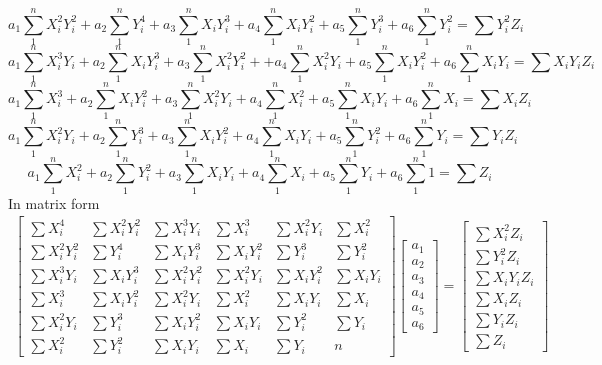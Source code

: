 \documentclass{article}
\begin{document}
\begin{equation}
a_1 \sum_1^n X_i^2Y_i^2 + a_2 \sum_1^n Y_i^4 + a_3 \sum_1^n X_iY_i^3 + a_4 \sum_1^n X_iY_i^2 +a_5 \sum_1^n Y_i^3 + a_6 \sum_1^n Y_i^2= \sum Y_i^2Z_i
\end{equation}
\begin{equation}
a_1 \sum_1^n X_i^3Y_i + a_2 \sum_1^n X_iY_i^3 + a_3 \sum_1^n X_i^2Y_i^2 + + a_4 \sum_1^n X_i^2Y_i +a_5 \sum_1^n X_iY_i^2 + a_6 \sum_1^n X_iY_i = \sum X_iY_iZ_i
\end{equation}
\begin{equation}
a_1 \sum_1^n X_i^3 + a_2 \sum_1^n X_iY_i^2 + a_3 \sum_1^n X_i^2Y_i + a_4 \sum_1^n X_i^2 +a_5 \sum_1^n X_iY_i + a_6 \sum_1^n X_i = \sum X_iZ_i
\end{equation}
\begin{equation}
a_1 \sum_1^n X_i^2Y_i + a_2 \sum_1^n Y_i^3 + a_3 \sum_1^n X_iY_i^2 + a_4 \sum_1^n X_iY_i +a_5 \sum_1^n Y_i^2 + a_6 \sum_1^n Y_i = \sum Y_iZ_i
\end{equation}
\begin{equation}
a_1 \sum_1^n X_i^2 + a_2 \sum_1^n Y_i^2 + a_3 \sum_1^n X_iY_i + a_4 \sum_1^n X_i +a_5 \sum_1^n Y_i + a_6 \sum_1^n 1 = \sum Z_i
\end{equation}
In matrix form \\
\begin{gather} 
    \begin{bmatrix}
        \sum X_i^4 & \sum X_i^2Y_i^2 & \sum X_i^3Y_i & \sum X_i^3 & \sum X_i^2Y_i & \sum X_i^2 \\
        \sum X_i^2Y_i^2 & \sum Y_i^4 & \sum X_iY_i^3 & \sum X_iY_i^2 & \sum Y_i^3 & \sum Y_i^2 \\
        \sum X_i^3Y_i & \sum X_iY_i^3 & \sum X_i^2Y_i^2 & \sum X_i^2Y_i & \sum X_iY_i^2 & \sum X_iY_i \\
        \sum X_i^3 & \sum X_iY_i^2 & \sum X_i^2Y_i & \sum X_i^2 & \sum X_iY_i & \sum X_i \\
        \sum X_i^2Y_i & \sum Y_i^3 & \sum X_iY_i^2 & \sum X_iY_i & \sum Y_i^2 & \sum Y_i \\
        \sum X_i^2 & \sum Y_i^2 & \sum X_iY_i & \sum X_i & \sum Y_i & n
    \end{bmatrix}
    \begin{bmatrix}
    a_1 \\ a_2 \\a_3 \\ a_4 \\ a_5 \\ a_6
    \end{bmatrix}
    =
    \begin{bmatrix}
    \sum X_i^2Z_i\\
    \sum Y_i^2Z_i\\
    \sum X_iY_iZ_i\\
    \sum X_iZ_i\\
    \sum Y_iZ_i\\
    \sum Z_i
    \end{bmatrix}
    \end{gather}
\end{document}
